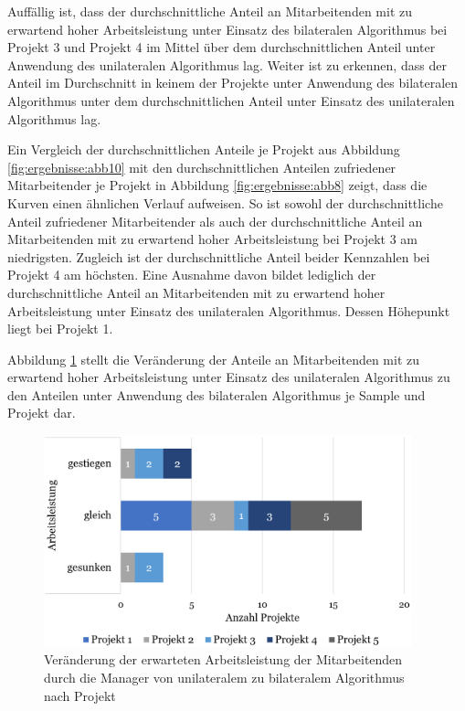Auffällig ist, dass der durchschnittliche Anteil an Mitarbeitenden mit zu erwartend hoher Arbeitsleistung unter Einsatz des bilateralen Algorithmus bei Projekt 3 und Projekt 4 im Mittel über dem durchschnittlichen Anteil unter Anwendung des unilateralen Algorithmus lag.
Weiter ist zu erkennen, dass der Anteil im Durchschnitt in keinem der Projekte unter Anwendung des bilateralen Algorithmus unter dem durchschnittlichen Anteil unter Einsatz des unilateralen Algorithmus lag.

Ein Vergleich der durchschnittlichen Anteile je Projekt aus Abbildung \ref{fig:ergebnisse:abb10} mit den durchschnittlichen Anteilen zufriedener Mitarbeitender je Projekt in Abbildung \ref{fig:ergebnisse:abb8} zeigt, dass die Kurven einen ähnlichen Verlauf aufweisen.
So ist sowohl der durchschnittliche Anteil zufriedener Mitarbeitender als auch der durchschnittliche Anteil an Mitarbeitenden mit zu erwartend hoher Arbeitsleistung bei Projekt 3 am niedrigsten.
Zugleich ist der durchschnittliche Anteil beider Kennzahlen bei Projekt 4 am höchsten.
Eine Ausnahme davon bildet lediglich der durchschnittliche Anteil an Mitarbeitenden mit zu erwartend hoher Arbeitsleistung unter Einsatz des unilateralen Algorithmus.
Dessen Höhepunkt liegt bei Projekt 1.

Abbildung \ref{fig:ergebnisse:abb11} stellt die Veränderung der Anteile an Mitarbeitenden mit zu erwartend hoher Arbeitsleistung unter Einsatz des unilateralen Algorithmus zu den Anteilen unter Anwendung des bilateralen Algorithmus je Sample und Projekt dar.

\begin{figure}[H]
    \centering
	\includegraphics[width=0.95\textwidth]{gfx/verhaeltnis-a-projekte.png}
	\caption[Veränderung der erwarteten Arbeitsleistung der Mitarbeitenden durch die Manager von unilateralem zu bilateralem Algorithmus nach Projekt]{Veränderung der erwarteten Arbeitsleistung der Mitarbeitenden durch die Manager von unilateralem zu bilateralem Algorithmus nach Projekt}
	\label{fig:ergebnisse:abb11}
\end{figure}

